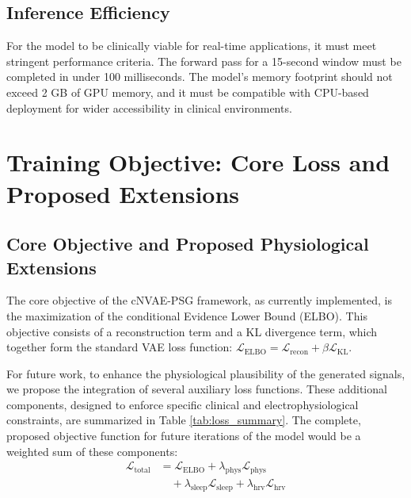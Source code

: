\documentclass[10pt, conference]{IEEEtran}
\begin{document}
\subsection{Inference Efficiency}
For the model to be clinically viable for real-time applications, it must meet stringent performance criteria. The forward pass for a 15-second window must be completed in under 100 milliseconds. The model's memory footprint should not exceed 2 GB of GPU memory, and it must be compatible with CPU-based deployment for wider accessibility in clinical environments.

\section{Training Objective: Core Loss and Proposed Extensions}

\subsection{Core Objective and Proposed Physiological Extensions}

The core objective of the cNVAE-PSG framework, as currently implemented, is the maximization of the conditional Evidence Lower Bound (ELBO). This objective consists of a reconstruction term and a KL divergence term, which together form the standard VAE loss function: $\mathcal{L}_{\text{ELBO}} = \mathcal{L}_{\text{recon}} + \beta \mathcal{L}_{\text{KL}}$.

For future work, to enhance the physiological plausibility of the generated signals, we propose the integration of several auxiliary loss functions. These additional components, designed to enforce specific clinical and electrophysiological constraints, are summarized in Table \ref{tab:loss_summary}. The complete, proposed objective function for future iterations of the model would be a weighted sum of these components:
\begin{align}
\mathcal{L}_{\text{total}} &= \mathcal{L}_{\text{ELBO}} + \lambda_{\text{phys}} \mathcal{L}_{\text{phys}} \\
&\quad + \lambda_{\text{sleep}} \mathcal{L}_{\text{sleep}} + \lambda_{\text{hrv}} \mathcal{L}_{\text{hrv}}
\end{align}
\end{document}
